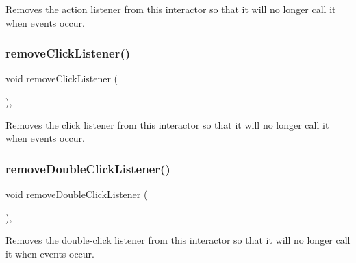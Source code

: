 Removes the action listener from this interactor so that it will no longer call it when events occur. 

\mbox{\label{classGInteractor_ad39d0325cde6b97ebda4b9d7787c633b}} 
\subsubsection{\texorpdfstring{remove\+Click\+Listener()}{removeClickListener()}}
{\footnotesize\ttfamily void remove\+Click\+Listener (\begin{DoxyParamCaption}{ }\end{DoxyParamCaption})\hspace{0.3cm}{\ttfamily [virtual]}, {\ttfamily [inherited]}}



Removes the click listener from this interactor so that it will no longer call it when events occur. 

\mbox{\label{classGInteractor_aa4250907e4cdd77349c04f0cf5cdd3d3}} 
\subsubsection{\texorpdfstring{remove\+Double\+Click\+Listener()}{removeDoubleClickListener()}}
{\footnotesize\ttfamily void remove\+Double\+Click\+Listener (\begin{DoxyParamCaption}{ }\end{DoxyParamCaption})\hspace{0.3cm}{\ttfamily [virtual]}, {\ttfamily [inherited]}}



Removes the double-\/click listener from this interactor so that it will no longer call it when events occur. 

\mbox{\label{classGObservable_acbcf1ed3a851ad8a3c17ef38d86b481d}} 
